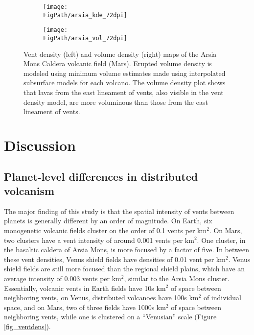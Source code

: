 \begin{figure}[h!]
    \centering
    \begin{subfigure}{0.49\textwidth}
        \centering
        \texttt{[image: \\FigPath/arsia\_kde\_72dpi]}
    \end{subfigure} 
    \begin{subfigure}{0.49\textwidth}
        \centering
        \texttt{[image: \\FigPath/arsia\_vol\_72dpi]}
    \end{subfigure}
    \caption[Vent density and volume density maps of the Arsia Mons Caldera volcanic field (Mars)]{Vent density (left) and volume density (right) maps of the Arsia Mons Caldera volcanic field (Mars). Erupted volume density is modeled using minimum volume estimates made using interpolated subsurface models for each volcano. The volume density plot shows that lavas from the east lineament of vents, also visible in the vent density model, are more voluminous than those from the east lineament of vents.}
\label{fig_arsia_kdevol}
\end{figure}

\section{Discussion}
\subsection{Planet-level differences in distributed volcanism}
The major finding of this study is that the spatial intensity of vents between planets is generally different by an order of magnitude. On Earth, six monogenetic volcanic fields cluster on the order of 0.1 vents per km$^2$. On Mars, two clusters have a vent intensity of around 0.001 vents per km$^2$. One cluster, in the basaltic caldera of Arsia Mons, is more focused by a factor of five. In between these vent densities, Venus shield fields have densities of 0.01 vent per km$^2$. Venus shield fields are still more focused than the regional shield plains, which have an average intensity of 0.003 vents per km$^2$, similar to the Arsia Mons cluster. Essentially, volcanic vents in Earth fields have 10s km$^2$ of space between neighboring vents, on Venus, distributed volcanoes have 100s km$^2$ of individual space, and on Mars, two of three fields have 1000s  km$^2$ of space between neighboring vents, while one is clustered on a ``Venusian'' scale (Figure \ref{fig_ventdens}).

